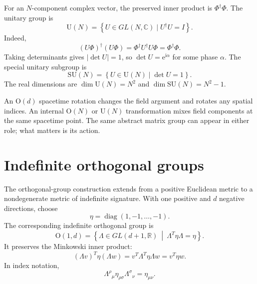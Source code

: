 \documentclass[11pt]{article}
\newcommand{\e}{\mathrm{e}}
\newcommand{\ii}{\mathrm{i}}
\newcommand{\R}{\mathbb{R}}
\newcommand{\C}{\mathbb{C}}
\newcommand{\OO}{\mathrm{O}}
\newcommand{\UU}{\mathrm{U}}
\newcommand{\SU}{\mathrm{SU}}
\begin{document}
For an $N$-component complex vector, the preserved inner product is
$\Phi^\dagger\Phi$.  The unitary group is
\begin{equation}
  \UU(N)=\left\{U\in GL(N,\C)\mid U^\dagger U=I\right\}.
  \label{eq:UNdefinition}
\end{equation}
Indeed,
\begin{equation}
  (U\Phi)^\dagger(U\Phi)
  =\Phi^\dagger U^\dagger U\Phi
  =\Phi^\dagger\Phi.
  \label{eq:UNinvariant}
\end{equation}
Taking determinants gives $|\det U|=1$, so $\det U=\e^{\ii\alpha}$ for some
phase $\alpha$.  The special unitary subgroup is
\begin{equation}
  \SU(N)=\left\{U\in\UU(N)\mid\det U=1\right\}.
  \label{eq:SUNdefinition}
\end{equation}
The real dimensions are $\dim\UU(N)=N^2$ and
$\dim\SU(N)=N^2-1$.

\begin{remarkbox}
An $\OO(d)$ spacetime rotation changes the field argument and rotates any
spatial indices.  An internal $\OO(N)$ or $\UU(N)$ transformation mixes field
components at the same spacetime point.  The same abstract matrix group can
appear in either role; what matters is its action.
\end{remarkbox}

\section{Indefinite orthogonal groups}

The orthogonal-group construction extends from a positive Euclidean metric
to a nondegenerate metric of indefinite signature.  With one positive and
\(d\) negative directions, choose
\begin{equation}
  \eta=\operatorname{diag}(1,-1,\ldots,-1).
  \label{eq:MinkowskiMetric}
\end{equation}
The corresponding indefinite orthogonal group is
\begin{equation}
  \OO(1,d)
  =\left\{
    \Lambda\in GL(d+1,\R)
    \ \middle|\
    \Lambda^T\eta\Lambda=\eta
  \right\}.
  \label{eq:LorentzGroupDefinition}
\end{equation}
It preserves the Minkowski inner product:
\begin{equation}
  (\Lambda v)^T\eta(\Lambda w)
  =v^T\Lambda^T\eta\Lambda w
  =v^T\eta w.
  \label{eq:LorentzInnerProduct}
\end{equation}
In index notation,
\begin{equation}
  \Lambda^\rho{}_\mu\eta_{\rho\sigma}
  \Lambda^\sigma{}_\nu
  =\eta_{\mu\nu}.
  \label{eq:LorentzIndexCondition}
\end{equation}
\end{document}
